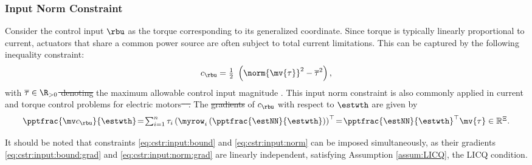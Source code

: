 \documentclass[letterpaper, journal]{IEEEtran}
\newcommand*{\template}{template}
\providecommand{\DIFadd}[1]{{\protect\color{blue}\uwave{#1}}} %
\providecommand{\DIFdel}[1]{{\protect\color{red}\sout{#1}}} %
\providecommand{\DIFaddbegin}{} %
\providecommand{\DIFaddend}{} %
\providecommand{\DIFdelbegin}{} %
\providecommand{\DIFdelend}{} %
\begin{document}
\subsubsection{Input Norm Constraint}\label{sec:appen:cstr:input:norm}

Consider the control input $\rbu$ as the torque corresponding to its generalized coordinate. 
Since torque is typically linearly proportional to current, actuators that share a common power source are often subject to total current limitations. 
This can be captured by the following inequality constraint: 
\begin{equation}
    c_{\rbu}
    =
    \tfrac{1}{2}\
    \left(
        \norm{
        \mv{\tau}
        }^2 
        -
        \overline\tau^2
    \right)
    ,
    \label{eq:cstr:input:norm}
\end{equation}
with \DIFdelbegin \DIFdel{$\overline\tau\in\R_{>0}$ denoting }\DIFdelend the maximum allowable control input magnitude \DIFaddbegin \DIFadd{$\overline\tau\in\R_{>0}$}\DIFaddend . This input norm constraint is also commonly applied in current and torque control problems for electric motors\DIFdelbegin \DIFdel{\mbox{%
\cite{Choi:2024aa}}\hskip0pt%
.
}\DIFdelend %
The \DIFdelbegin \DIFdel{gradients }\DIFdelend \DIFaddbegin \DIFadd{gradient }\DIFaddend of $c_{\rbu}$ with respect to $\estwth$ are given by
\begin{equation}
    \pptfrac{\mv c_{\rbu}}{\estwth}
    \!=\! 
    \textstyle\sum_{i=1}^n \tau_{i} 
    \left(
        \myrow_i
        \left(
            \pptfrac{\estNN}{\estwth}
        \right)
    \right)^\top  
    \!=\! 
    {\pptfrac{\estNN}{\estwth}}^\top
    \mv{\tau}
    \in \mathbb R^{\Xi}.
    \label{eq:cstr:input:norm:grad}
\end{equation}

\hfill

It should be noted that constraints \eqref{eq:cstr:input:bound} and \eqref{eq:cstr:input:norm} can be imposed simultaneously, as their gradients \eqref{eq:cstr:input:bound:grad} and \eqref{eq:cstr:input:norm:grad} are linearly independent, satisfying Assumption \ref{assum:LICQ}, \ie the LICQ condition.


% 

\end{document}
